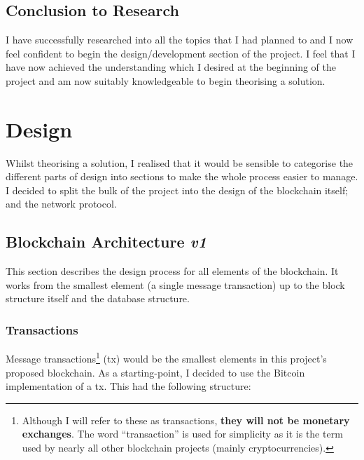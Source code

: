 \documentclass{article}
\begin{document}
\subsection{Conclusion to Research}
I have successfully researched into all the topics that I had planned to and I now feel confident to begin the design/development section of the project. I feel that I have now achieved the understanding which I desired at the beginning of the project and am now suitably knowledgeable to begin theorising a solution.

\newpage


\section{Design}

Whilst theorising a solution, I realised that it would be sensible to categorise the different parts of design into sections to make the whole process easier to manage. I decided to split the bulk of the project into the design of the blockchain itself; and the network protocol.

\subsection{Blockchain Architecture \textit{v1}}
This section describes the design process for all elements of the blockchain. It works from the smallest element (a single message transaction) up to the block structure itself and the database structure.

\subsubsection{Transactions}
Message transactions\footnote{Although I will refer to these as transactions, \textbf{they will not be monetary exchanges}. The word ``transaction'' is used for simplicity as it is the term used by nearly all other blockchain projects (mainly cryptocurrencies).} (tx) would be the smallest elements in this project's proposed blockchain. As a starting-point, I decided to use the Bitcoin implementation of a tx\cite{bitcoin_protocol}. This had the following structure:
\end{document}
